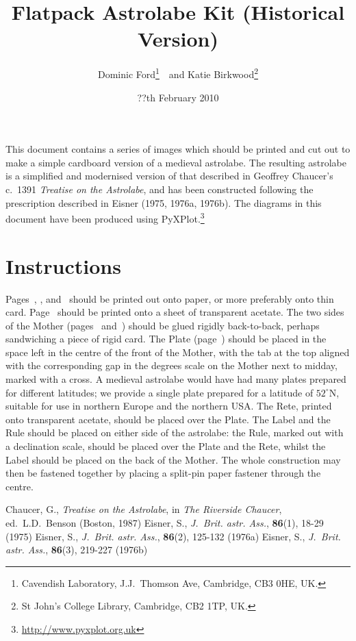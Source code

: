 \documentclass[a4paper,onecolumn,10pt]{article}
\title{\vspace{-3cm}Flatpack Astrolabe Kit (Historical Version)}
\author{Dominic Ford\footnote{Cavendish Laboratory, J.J.\ Thomson Ave, Cambridge, CB3 0HE, UK.}~~and Katie Birkwood\footnote{St John's College Library, Cambridge, CB2 1TP, UK.}}
\date{??th February 2010}
\begin{document}
\maketitle
\setcounter{footnote}{3}

This document contains a series of images which should be printed and cut out
to make a simple cardboard version of a medieval astrolabe. The resulting
astrolabe is a simplified and modernised version of that described in Geoffrey
Chaucer's c.\ 1391 {\it Treatise on the Astrolabe}, and has been constructed
following the prescription described in Eisner (1975, 1976a, 1976b). The
diagrams in this document have been produced using
PyXPlot.\footnote{\url{http://www.pyxplot.org.uk}}

\section*{Instructions}

Pages~\pageref{mother_back}, \pageref{mother_front}, \pageref{plate}
and~\pageref{rule} should be printed out onto paper, or more preferably onto
thin card.  Page~\pageref{rete} should be printed onto a sheet of transparent
acetate. The two sides of the Mother (pages~\pageref{mother_back}
and~\pageref{mother_front}) should be glued rigidly back-to-back, perhaps
sandwiching a piece of rigid card. The Plate (page~\pageref{plate}) should be
placed in the space left in the centre of the front of the Mother, with the tab
at the top aligned with the corresponding gap in the degrees scale on the
Mother next to midday, marked with a cross. A medieval astrolabe would have had
many plates prepared for different latitudes; we provide a single plate
prepared for a latitude of $52^\circ$N, suitable for use in northern Europe and
the northern USA. The Rete, printed onto transparent acetate, should be placed
over the Plate.  The Label and the Rule should be placed on either side of the
astrolabe: the Rule, marked out with a declination scale, should be placed over
the Plate and the Rete, whilst the Label should be placed on the back of the
Mother. The whole construction may then be fastened together by placing a
split-pin paper fastener through the centre.

\begin{thebibliography}{9}
Chaucer, G., \textit{Treatise on the Astrolabe}, in {\it The Riverside Chaucer}, ed.\ L.D.\ Benson (Boston, 1987)
Eisner, S., \textit{J.\ Brit. astr. Ass.}, \textbf{86}(1), 18-29 (1975)
Eisner, S., \textit{J.\ Brit. astr. Ass.}, \textbf{86}(2), 125-132 (1976a)
Eisner, S., \textit{J.\ Brit. astr. Ass.}, \textbf{86}(3), 219-227 (1976b)
\end{thebibliography}
\end{document}
